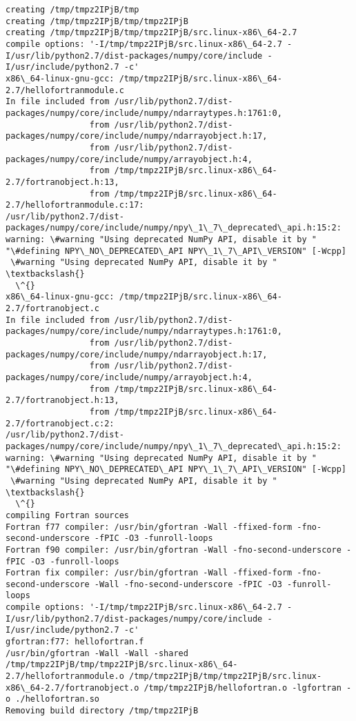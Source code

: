 \begin{Verbatim}[commandchars=\\\{\}]
creating /tmp/tmpz2IPjB/tmp
creating /tmp/tmpz2IPjB/tmp/tmpz2IPjB
creating /tmp/tmpz2IPjB/tmp/tmpz2IPjB/src.linux-x86\_64-2.7
compile options: '-I/tmp/tmpz2IPjB/src.linux-x86\_64-2.7 -I/usr/lib/python2.7/dist-packages/numpy/core/include -I/usr/include/python2.7 -c'
x86\_64-linux-gnu-gcc: /tmp/tmpz2IPjB/src.linux-x86\_64-2.7/hellofortranmodule.c
In file included from /usr/lib/python2.7/dist-packages/numpy/core/include/numpy/ndarraytypes.h:1761:0,
                 from /usr/lib/python2.7/dist-packages/numpy/core/include/numpy/ndarrayobject.h:17,
                 from /usr/lib/python2.7/dist-packages/numpy/core/include/numpy/arrayobject.h:4,
                 from /tmp/tmpz2IPjB/src.linux-x86\_64-2.7/fortranobject.h:13,
                 from /tmp/tmpz2IPjB/src.linux-x86\_64-2.7/hellofortranmodule.c:17:
/usr/lib/python2.7/dist-packages/numpy/core/include/numpy/npy\_1\_7\_deprecated\_api.h:15:2: warning: \#warning "Using deprecated NumPy API, disable it by " "\#defining NPY\_NO\_DEPRECATED\_API NPY\_1\_7\_API\_VERSION" [-Wcpp]
 \#warning "Using deprecated NumPy API, disable it by " \textbackslash{}
  \^{}
x86\_64-linux-gnu-gcc: /tmp/tmpz2IPjB/src.linux-x86\_64-2.7/fortranobject.c
In file included from /usr/lib/python2.7/dist-packages/numpy/core/include/numpy/ndarraytypes.h:1761:0,
                 from /usr/lib/python2.7/dist-packages/numpy/core/include/numpy/ndarrayobject.h:17,
                 from /usr/lib/python2.7/dist-packages/numpy/core/include/numpy/arrayobject.h:4,
                 from /tmp/tmpz2IPjB/src.linux-x86\_64-2.7/fortranobject.h:13,
                 from /tmp/tmpz2IPjB/src.linux-x86\_64-2.7/fortranobject.c:2:
/usr/lib/python2.7/dist-packages/numpy/core/include/numpy/npy\_1\_7\_deprecated\_api.h:15:2: warning: \#warning "Using deprecated NumPy API, disable it by " "\#defining NPY\_NO\_DEPRECATED\_API NPY\_1\_7\_API\_VERSION" [-Wcpp]
 \#warning "Using deprecated NumPy API, disable it by " \textbackslash{}
  \^{}
compiling Fortran sources
Fortran f77 compiler: /usr/bin/gfortran -Wall -ffixed-form -fno-second-underscore -fPIC -O3 -funroll-loops
Fortran f90 compiler: /usr/bin/gfortran -Wall -fno-second-underscore -fPIC -O3 -funroll-loops
Fortran fix compiler: /usr/bin/gfortran -Wall -ffixed-form -fno-second-underscore -Wall -fno-second-underscore -fPIC -O3 -funroll-loops
compile options: '-I/tmp/tmpz2IPjB/src.linux-x86\_64-2.7 -I/usr/lib/python2.7/dist-packages/numpy/core/include -I/usr/include/python2.7 -c'
gfortran:f77: hellofortran.f
/usr/bin/gfortran -Wall -Wall -shared /tmp/tmpz2IPjB/tmp/tmpz2IPjB/src.linux-x86\_64-2.7/hellofortranmodule.o /tmp/tmpz2IPjB/tmp/tmpz2IPjB/src.linux-x86\_64-2.7/fortranobject.o /tmp/tmpz2IPjB/hellofortran.o -lgfortran -o ./hellofortran.so
Removing build directory /tmp/tmpz2IPjB

    \end{Verbatim}



